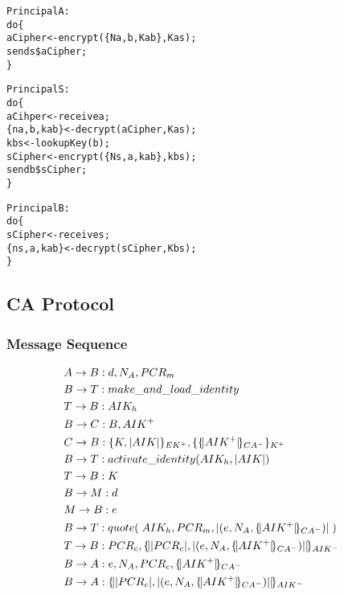 \documentclass[10pt]{article}
\begin{document}
\begin{alltt}
  Principal A:
  do \{                
       aCipher <- encrypt(\{ Na, b, Kab \}, Kas);
       send s \$ aCipher;    
  \}
\end{alltt}

\begin{alltt}
  Principal S:
  do \{               
       aCihper <- receive a;
       \{ na, b, kab \} <- decrypt(aCipher, Kas);
       kbs <- lookupKey(b);   
       sCipher <- encrypt(\{ Ns, a, kab \}, kbs); 
       send b \$ sCipher;
  \}
\end{alltt}

\begin{alltt}
  Principal B:
  do \{                
       sCipher <- receive s;
       \{ ns, a, kab \} <- decrypt(sCipher, Kbs);	    
  \}
\end{alltt}

\newpage

\subsection*{CA Protocol}

\subsubsection*{Message Sequence}

\def \pmask {PCR_{m}}
\def \pcomp {PCR_{c}}
\def \evd {d}
\def \eve {e}
\def \cacert {\sign {\public{AIK}}{CA}}
\def \exdata {\hashe{(\eve, \nonce{A}, \cacert ) }}
\def \aikh {AIK_{h}}

\def \app {A}
\def \att {B}
\def \ca {C}
\def \mea {M}
\def \tp {T}

\def \req {R}
\def \resp {P}
\def \k {K}

\begin{align*}
  & \sndmsg {\app}{\att} {\evd, \nonce{\app}, \pmask}  & \\
    & \sndmsg{\att}{\tp} {make\_and\_load\_identity} & \\
      & \sndmsg{\tp}{\att} {\aikh} & \\
        & \sndmsg{\att}{\ca} {\att, \public{AIK}}  & \\
  & \sndmsg{\ca}{\att} {\encrypt{K, \hashe{AIK}}{EK}, \encrypt{\cacert}{K}} & \\
    & \sndmsg{\att}{\tp} {activate\_identity({\aikh, \hashe{AIK})}} & \\
  & \sndmsg{\tp}{\att} {K} & \\
    & \sndmsg{\att}{\mea} {\evd}  & \\
  & \sndmsg{\mea}{\att} {\eve}  & \\
  & \sndmsg{\att}{\tp} {quote(\;{AIK_{h}, \pmask, \exdata}\;)} & \\
  & \sndmsg{\tp}{\att} {\pcomp, \sign{\hashe{\pcomp}, \exdata}{AIK}}  & \\
  & \sndmsg{\att}{\app} {\eve, \nonce{\app}, \pcomp, \cacert}  & \\
  & \sndmsg{\att}{\app} {\sign{\hashe{\pcomp}, \exdata}{AIK}}  & 
\end{align*}
\end{document}
